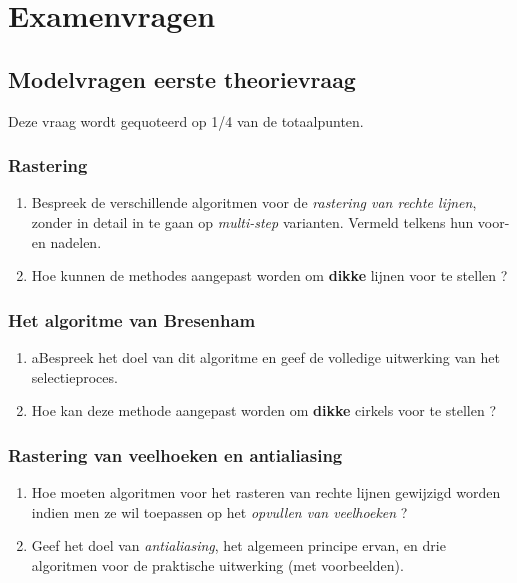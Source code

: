 \documentclass{report}
\begin{document}
	\tableofcontents
	
	
	\part{Examenvragen}
	\chapter{Modelvragen eerste theorievraag}
	Deze vraag wordt gequoteerd op 1/4 van de totaalpunten.
	
	\section{Rastering}
	\begin{enumerate}
		\item Bespreek de verschillende algoritmen voor de \textit{rastering van rechte lijnen}, zonder in detail in te gaan op \textit{multi-step} varianten. Vermeld telkens hun voor- en nadelen. 
		
		\item Hoe kunnen de methodes aangepast worden om \textbf{dikke} lijnen voor te stellen ? 
	\end{enumerate}

	\section{Het algoritme van Bresenham}
	\begin{enumerate}
		\item aBespreek het doel van dit algoritme en geef de volledige uitwerking van het selectieproces. 
		
		\item Hoe kan deze methode aangepast worden om \textbf{dikke} cirkels voor te stellen ? 
	\end{enumerate}

	\section{Rastering van veelhoeken en antialiasing}
	\begin{enumerate}
		\item Hoe moeten algoritmen voor het rasteren van rechte lijnen gewijzigd worden indien men ze wil toepassen op het \textit{opvullen van veelhoeken} ? 
		
		\item Geef het doel van \textit{antialiasing}, het algemeen principe ervan, en drie algoritmen voor de praktische uitwerking (met voorbeelden). 
	\end{enumerate}
\end{document}

